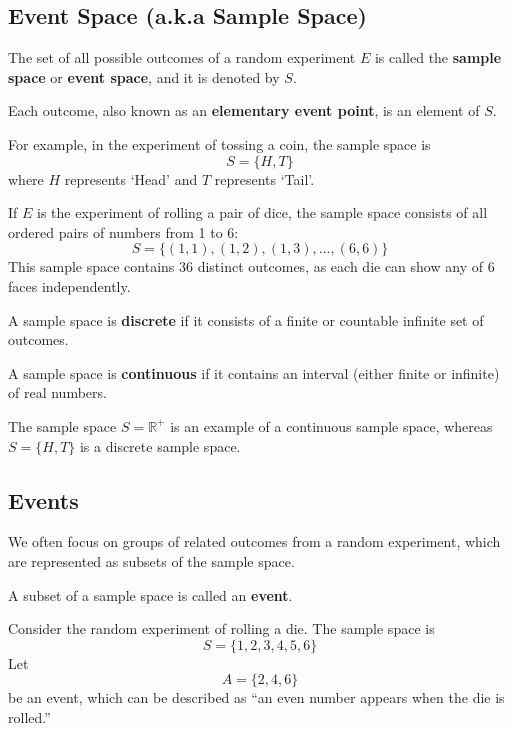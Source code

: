 \documentclass[twoside]{book}
\begin{document}
\subsection{Event Space (a.k.a Sample Space)}

\begin{textbox}
    The set of all possible outcomes of a random experiment $E$ is called the \textbf{sample space} or \textbf{event space}, and it is denoted by $S$.
\end{textbox}

Each outcome, also known as an \textbf{elementary event point}, is an element of $S$.

For example, in the experiment of tossing a coin, the sample space is  
\[
S = \{H, T\}
\]  
where $H$ represents `Head’ and $T$ represents `Tail’.

If $E$ is the experiment of rolling a pair of dice, the sample space consists of all ordered pairs of numbers from 1 to 6:
\[
S = \{(1,1), (1,2), (1,3), \dots, (6,6)\}
\]
This sample space contains 36 distinct outcomes, as each die can show any of 6 faces independently.

\begin{textbox}
A sample space is \textbf{discrete} if it consists of a ﬁnite or countable inﬁnite set of outcomes.

A sample space is \textbf{continuous} if it contains an interval (either ﬁnite or inﬁnite) of real
numbers.
\end{textbox}
The sample space $S = \mathbb{R}^+$ is an example of a continuous sample space, whereas $S = \{H, T\}$ is a discrete sample space.

\subsection{Events}
We often focus on groups of related outcomes from a random experiment, which are represented as subsets of the sample space.
\begin{textbox}
    A subset of a sample space is called an \textbf{event}.
\end{textbox}

Consider the random experiment of rolling a die. The sample space is
\[
S = \{1, 2, 3, 4, 5, 6\}
\]
Let
\[
A = \{2, 4, 6\}
\]
be an event, which can be described as ``an even number appears when the die is rolled.''
\end{document}
